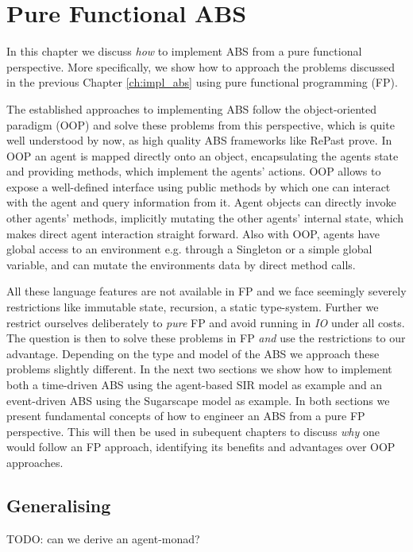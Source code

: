 \chapter{Pure Functional ABS}
\label{ch:pfABS}

In this chapter we discuss \textit{how} to implement ABS from a pure functional perspective. More specifically, we show how to approach the problems discussed in the previous Chapter \ref{ch:impl_abs} using pure functional programming (FP).

The established approaches to implementing ABS follow the object-oriented paradigm (OOP) and solve these problems from this perspective, which is quite well understood by now, as high quality ABS frameworks like RePast \cite{north_complex_2013} prove. In OOP an agent is mapped directly onto an object, encapsulating the agents state and providing methods, which implement the agents' actions. OOP allows to expose a well-defined interface using public methods by which one can interact with the agent and query information from  it. Agent objects can directly invoke other agents' methods, implicitly mutating the other agents' internal state, which makes direct agent interaction straight forward. Also with OOP, agents have global access to an environment e.g. through a Singleton or a simple global variable, and can mutate the environments data by direct method calls.

All these language features are not available in FP and we face seemingly severely restrictions like immutable state, recursion, a static type-system. Further we restrict ourselves deliberately to \textit{pure} FP and avoid running in \textit{IO} under all costs. The question is then to solve these problems in FP \textit{and} use the restrictions to our advantage. Depending on the type and model of the ABS we approach these problems slightly different. In the next two sections we show how to implement both a time-driven ABS using the agent-based SIR model as example and an event-driven ABS using the Sugarscape model as example. In both sections we present fundamental concepts of how to engineer an ABS from a pure FP perspective. This will then be used in subequent chapters to discuss \textit{why} one would follow an FP approach, identifying its benefits and advantages over OOP approaches.





\section{Generalising}
TODO: can we derive an agent-monad?

